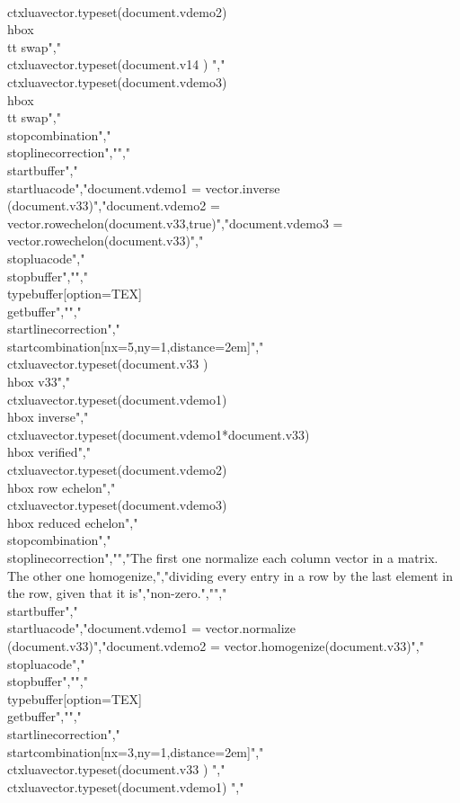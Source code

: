 {\\ctxlua{vector.typeset(document.vdemo2)}} {\\hbox{\\tt swap}}","    {\\ctxlua{vector.typeset(document.v14   )}} {}","    {\\ctxlua{vector.typeset(document.vdemo3)}} {\\hbox{\\tt swap}}","\\stopcombination","\\stoplinecorrection","","\\startbuffer","\\startluacode","document.vdemo1 = vector.inverse   (document.v33)","document.vdemo2 = vector.rowechelon(document.v33,true)","document.vdemo3 = vector.rowechelon(document.v33)","\\stopluacode","\\stopbuffer","","\\typebuffer[option=TEX] \\getbuffer","","\\startlinecorrection","\\startcombination[nx=5,ny=1,distance=2em]","    {\\ctxlua{vector.typeset(document.v33   )}}              {\\hbox {v33}}","    {\\ctxlua{vector.typeset(document.vdemo1)}}              {\\hbox {inverse}}","    {\\ctxlua{vector.typeset(document.vdemo1*document.v33)}} {\\hbox {verified}}","    {\\ctxlua{vector.typeset(document.vdemo2)}}              {\\hbox {row echelon}}","    {\\ctxlua{vector.typeset(document.vdemo3)}}              {\\hbox {reduced echelon}}","\\stopcombination","\\stoplinecorrection","","The first one normalize each column vector in a matrix. The other one homogenize,","dividing every entry in a row by the last element in the row, given that it is","non-zero.","","\\startbuffer","\\startluacode","document.vdemo1 = vector.normalize (document.v33)","document.vdemo2 = vector.homogenize(document.v33)","\\stopluacode","\\stopbuffer","","\\typebuffer[option=TEX] \\getbuffer","","\\startlinecorrection","\\startcombination[nx=3,ny=1,distance=2em]","    {\\ctxlua{vector.typeset(document.v33   )}} {}","    {\\ctxlua{vector.typeset(document.vdemo1)}} {}","    